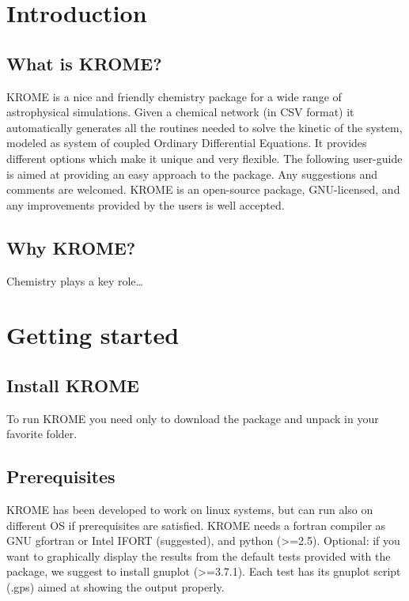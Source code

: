 \documentclass[10pt]{article}
\begin{document}
\lstset{language=Fortran}
\setlength\parindent{0pt}
\section{Introduction}

\subsection{What is KROME?}
KROME is a nice and friendly chemistry package for a wide range of astrophysical simulations. Given a chemical
network (in CSV format) it automatically generates all the routines needed to solve the kinetic of the system, 
modeled as system of coupled Ordinary Differential Equations. It provides different options which make it unique and very
flexible. The following user-guide is aimed at providing an easy approach to the package. Any suggestions and
comments are welcomed. KROME is an open-source package, GNU-licensed, and any improvements provided by the
users is well accepted.

\subsection{Why KROME?}
Chemistry plays a key role\dots

\section{Getting started}

\subsection{Install KROME}
To run KROME you need only to download the package and unpack in your favorite folder.

\subsection{Prerequisites}
KROME has been developed to work on linux systems, but can run also on different OS if prerequisites are satisfied.
KROME needs a fortran compiler as GNU gfortran or Intel IFORT (suggested), and python (>=2.5).
Optional: if you want to graphically display the results from the default tests provided with the package, 
we suggest to install gnuplot (>=3.7.1). Each test has its gnuplot script (.gps) aimed at showing the output properly.
\end{document}

